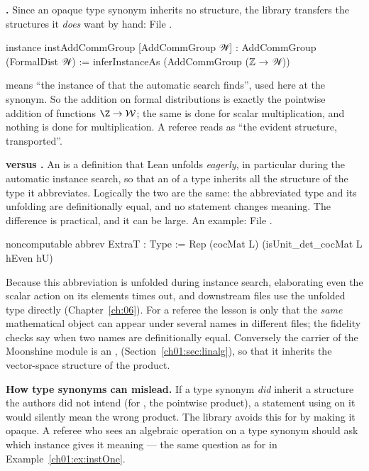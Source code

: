 \textbf{.} Since an opaque type synonym inherits no structure, the library
transfers the structures it \emph{does} want by hand:
\noindent File .
\begin{leancode}
instance instAddCommGroup [AddCommGroup 𝒲] : AddCommGroup (FormalDist 𝒲) :=
  inferInstanceAs (AddCommGroup (ℤ → 𝒲))
\end{leancode}
 means ``the instance of  that the automatic search finds'', used
here at the synonym. So the addition on formal distributions is exactly the pointwise addition of
functions $\Z\to\mathcal W$; the same is done for scalar multiplication, and nothing is done for
multiplication. A referee reads  as ``the evident structure, transported''.

\textbf{ versus .} An  is a definition that Lean unfolds
\emph{eagerly}, in particular during the automatic instance search, so that an  of a
type inherits all the structure of the type it abbreviates. Logically the two are the same: the
abbreviated type and its unfolding are definitionally equal, and no statement changes meaning. The
difference is practical, and it can be large. An example:
\noindent File .
\begin{leancode}
noncomputable abbrev ExtraT : Type := Rep (cocMat L) (isUnit_det_cocMat L hEven hU)
\end{leancode}
Because this abbreviation is unfolded during instance search, elaborating even the scalar action
on its elements times out, and downstream files use the unfolded type 
directly (Chapter~\ref{ch:06}). For a referee the lesson is only that the \emph{same} mathematical
object can appear under several names in different files; the fidelity checks say when two names are
definitionally equal. Conversely the carrier of the Moonshine module is an ,
 (Section~\ref{ch01:sec:linalg}), so that it inherits the
vector-space structure of the product.

\begin{warning}
\textbf{How type synonyms can mislead.} If a type synonym \emph{did} inherit a structure the
authors did not intend (for , the pointwise product), a statement using \lean{*} on
it would silently mean the wrong product. The library avoids this for  by making it
opaque. A referee who sees an algebraic operation on a type synonym should ask which instance gives
it meaning --- the same question as for  in Example~\ref{ch01:ex:instOne}.
\end{warning}

